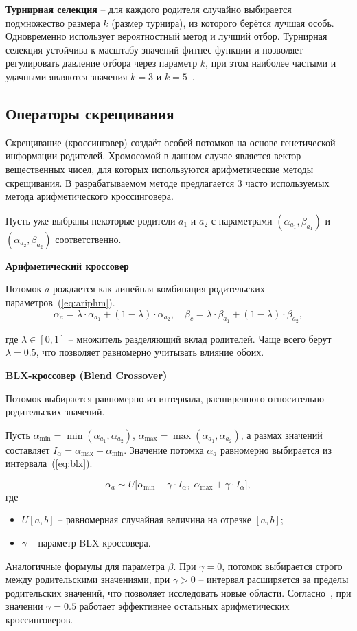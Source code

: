 \textbf{Турнирная селекция} -- для каждого родителя случайно выбирается подмножество размера $k$ (размер турнира), из которого берётся лучшая особь. Одновременно использует вероятностный метод и лучший отбор. Турнирная селекция устойчива к масштабу значений фитнес-функции и позволяет регулировать давление отбора через параметр $k$, при этом наиболее частыми и удачными являются значения $k=3$ и $k=5$~\cite{genetic-engineer}.

\subsection{Операторы скрещивания}

Скрещивание (кроссинговер) создаёт особей-потомков на основе генетической информации родителей. Хромосомой в данном случае является вектор вещественных чисел, для которых используются арифметические методы скрещивания. В разрабатываемом методе предлагается 3 часто используемых метода арифметического кроссинговера.

Пусть уже выбраны некоторые родители \(a_1\) и \(a_2\) с параметрами \((\alpha_{a_1}, \beta_{a_1})\) и \((\alpha_{a_2}, \beta_{a_2})\) соответственно.

\textbf{Арифметический кроссовер}

Потомок \(a\) рождается как линейная комбинация родительских параметров~(\ref{eq:ariphm}).
\begin{equation}
	\alpha_a = \lambda \cdot \alpha_{a_1} + (1 - \lambda) \cdot \alpha_{a_2}, \quad \beta_c = \lambda \cdot \beta_{a_1} + (1 - \lambda) \cdot \beta_{a_2},
	\label{eq:ariphm}
\end{equation}

где $\lambda \in [0, 1]$ -- множитель разделяющий вклад родителей. Чаще всего берут $\lambda=0.5$, что позволяет равномерно учитывать влияние обоих.

\textbf{BLX-кроссовер (Blend Crossover)}

Потомок выбирается равномерно из интервала, расширенного относительно родительских значений. 

Пусть \(\alpha_{\min} = \min(\alpha_{a_1}, \alpha_{a_2})\), \(\alpha_{\max} = \max(\alpha_{a_1}, \alpha_{a_2})\), а размах значений составляет \(I_\alpha = \alpha_{\max} - \alpha_{\min}\). Значение потомка $\alpha_a$ равномерно выбирается из интервала~(\ref{eq:blx}).

\begin{equation}
\alpha_a \sim U\bigl[\alpha_{\min} - \gamma \cdot I_\alpha,\; \alpha_{\max} + \gamma \cdot I_\alpha\bigr],
\label{eq:blx}
\end{equation}
где 
\begin{itemize}
	\item $U[a,b]$ -- равномерная случайная величина на отрезке $[a, b]$;
	\item $\gamma$ -- параметр BLX-кроссовера.
\end{itemize}
Аналогичные формулы для параметра $\beta$. При $\gamma=0$, потомок выбирается строго между родительскими значениями, при $\gamma>0$ -- интервал расширяется за пределы родительских значений, что позволяет исследовать новые области. Согласно~\cite{genetic-engineer}, при значении $\gamma=0.5$  работает эффективнее остальных арифметических кроссинговеров.

